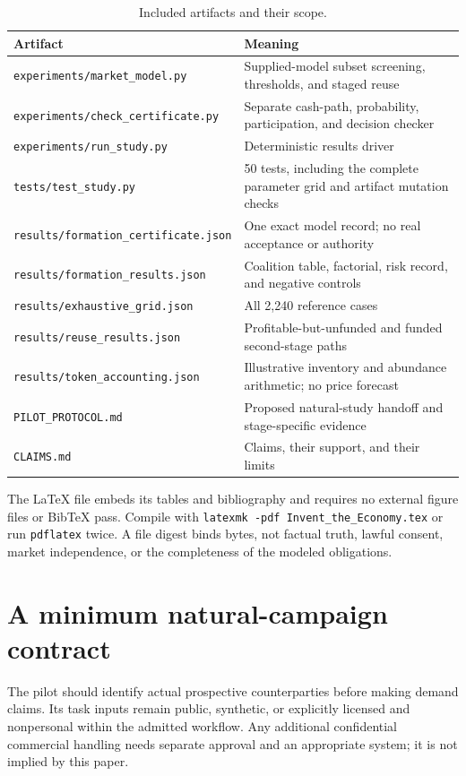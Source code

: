 \documentclass[11pt,letterpaper]{article}
\theoremstyle{remark}\newtheorem{remark}{Remark}[section]
\begin{document}
\begin{table}[htbp]\centering\small
\caption{Included artifacts and their scope.}
\begin{tabularx}{\linewidth}{@{}P{.43\linewidth}Y@{}}\toprule
Artifact & Meaning\\\midrule
\texttt{experiments/market\_model.py} & Supplied-model subset screening, thresholds, and staged reuse\\
\texttt{experiments/check\_certificate.py} & Separate cash-path, probability, participation, and decision checker\\
\texttt{experiments/run\_study.py} & Deterministic results driver\\
\texttt{tests/test\_study.py} & 50 tests, including the complete parameter grid and artifact mutation checks\\
\texttt{results/formation\_certificate.json} & One exact model record; no real acceptance or authority\\
\texttt{results/formation\_results.json} & Coalition table, factorial, risk record, and negative controls\\
\texttt{results/exhaustive\_grid.json} & All 2,240 reference cases\\
\texttt{results/reuse\_results.json} & Profitable-but-unfunded and funded second-stage paths\\
\texttt{results/token\_accounting.json} & Illustrative inventory and abundance arithmetic; no price forecast\\
\texttt{PILOT\_PROTOCOL.md} & Proposed natural-study handoff and stage-specific evidence\\
\texttt{CLAIMS.md} & Claims, their support, and their limits\\\bottomrule
\end{tabularx}
\end{table}

The LaTeX file embeds its tables and bibliography and requires no external figure files or BibTeX pass. Compile with \texttt{latexmk -pdf Invent\_the\_Economy.tex} or run \texttt{pdflatex} twice. A file digest binds bytes, not factual truth, lawful consent, market independence, or the completeness of the modeled obligations.

\section{A minimum natural-campaign contract}
The pilot should identify actual prospective counterparties before making demand claims. Its task inputs remain public, synthetic, or explicitly licensed and nonpersonal within the admitted workflow. Any additional confidential commercial handling needs separate approval and an appropriate system; it is not implied by this paper.
\end{document}
